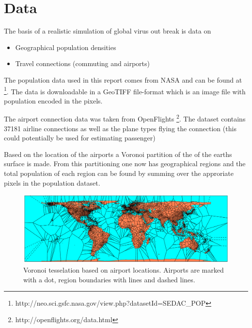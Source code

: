 \section{Data}

The basis of a realistic simulation of global virus out break is data on
\begin{itemize}
	\item Geographical population densities
	\item Travel connections (commuting and airports)
\end{itemize}

The population data used in this report comes from NASA and can be found at \footnote{http://neo.sci.gsfc.nasa.gov/view.php?datasetId=SEDAC\_POP}. The data is downloadable in a GeoTIFF file-format which is an image file with population encoded in the pixels. 


The airport connection data was taken from OpenFlights \footnote{http://openflights.org/data.html}. The dataset contains 37181 airline connections as well as the plane types flying the connection (this could potentially be used for estimating passenger)

Based on the location of the airports a Voronoi partition of the of the earths surface is made. From this partitioning one now has geographical regions and the total population of each region can be found by summing over the approriate pixels in the population dataset. 

\begin{figure}[H]
	\centering
	\includegraphics[width=1.0 \textwidth]{plots/voronoi.pdf}
	\caption{Voronoi tesselation based on airport locations. Airports are marked with a dot, region boundaries with lines and dashed lines.}
\end{figure}

